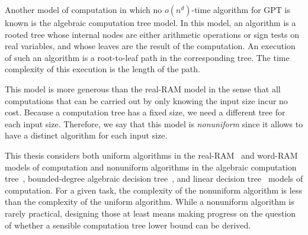 Another model of computation in which no \(o(n^d)\)-time algorithm for GPT
is known is the algebraic computation tree model.
%
In this model, an algorithm is a rooted tree whose internal nodes are either
arithmetic operations or sign tests on real variables, and whose leaves are the
result of the computation.
%
An execution of such an algorithm is a root-to-leaf path in the corresponding
tree.
%
The time complexity of this execution is the length of the path.

This model is
more generous than the real-RAM model in the sense that all computations that
can be carried out by only knowing the input size incur no cost.
%
Because a computation tree has a fixed size, we need a different tree for each
input size.
%
Therefore,
we say that this model is \emph{nonuniform} since it allows to have a
distinct algorithm for each input size.

This thesis considers both uniform algorithms in
the real-RAM~\cite[Section~2.3]{Sha78}
and
word-RAM~\cite{FW90}
models of computation and nonuniform algorithms
in the algebraic computation tree~\cite[Section~2]{Be83},
bounded-degree algebraic decision tree~\cite[Section~2]{SY82},
and linear decision tree~\cite[Section~2]{DL78} models of computation.
%
For a given task, the complexity of the nonuniform algorithm is less than
the complexity of the uniform algorithm.
%
While a nonuniform algorithm is rarely practical, designing those at least
means making progress on the question of whether a sensible computation tree
lower bound can be derived.
